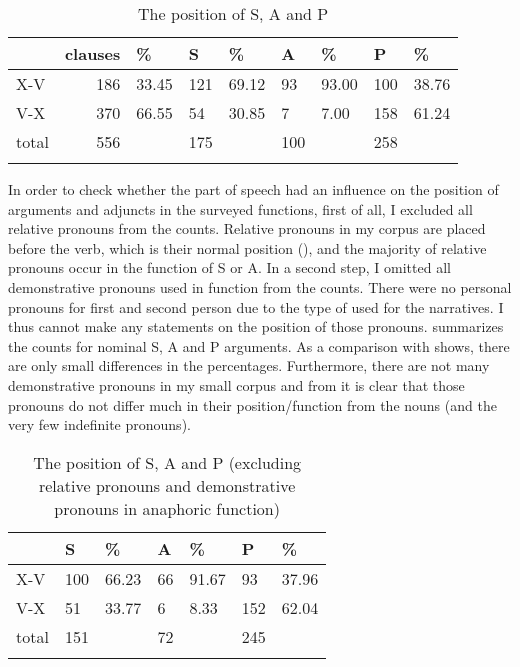 \documentclass[output=paper,colorlinks,citecolor=brown,draftmode]{langscibook}
\begin{document}
\begin{table}
\begin{tabularx}{\textwidth}{lrYYYYYYY}
\lsptoprule
 & clauses & \% & S & \% & A & \% & P & \% \\
 \midrule
X-V & 186 & 33.45 & 121 & 69.12 & 93 & 93.00 & 100 & 38.76 \\
V-X & 370 & 66.55 & 54 & 30.85 & 7 & 7.00 & 158 & 61.24 \\
\midrule total & 556 & & 175 & & 100 & & 258 & \\
\lspbottomrule
 \end{tabularx}
 \caption{The position of S, A and P}
 \label{EC:tab:2}
\end{table}

In order to check whether the part of speech had an influence on the position of arguments and adjuncts in the surveyed functions, first of all, I excluded all relative pronouns from the counts. Relative pronouns in my corpus are placed before the verb, which is their normal position (\citealt{harris_word_2000}), and the majority of relative pronouns occur in the function of S or A. In a second step, I omitted all demonstrative pronouns used in 
function from the counts. There were no personal pronouns for first and second person due to the type of  used for the narratives. I thus cannot make any statements on the position of those pronouns.  summarizes the counts for nominal S, A and P arguments. As a comparison with  shows, there are only small differences in the percentages. Furthermore, there are not many demonstrative pronouns in my small corpus and from  it is clear that those pronouns do not differ much in their position/function from the nouns (and the very few indefinite pronouns).

\begin{table}
 \begin{tabularx}{\textwidth}{lYYYYYY}
\lsptoprule
 & S & \% & A & \% & P & \% \\
\midrule
X-V & 100 & 66.23 & 66 & 91.67 & 93 & 37.96 \\
V-X & 51 & 33.77 & 6 & 8.33 & 152 & 62.04 \\
\midrule total & 151 & & 72 & & 245 & \\
\lspbottomrule
 \end{tabularx}
 \caption{The position of S, A and P (excluding relative pronouns and demonstrative pronouns in anaphoric
 function)}
 \label{EC:tab:2a}
\end{table}
\end{document}

